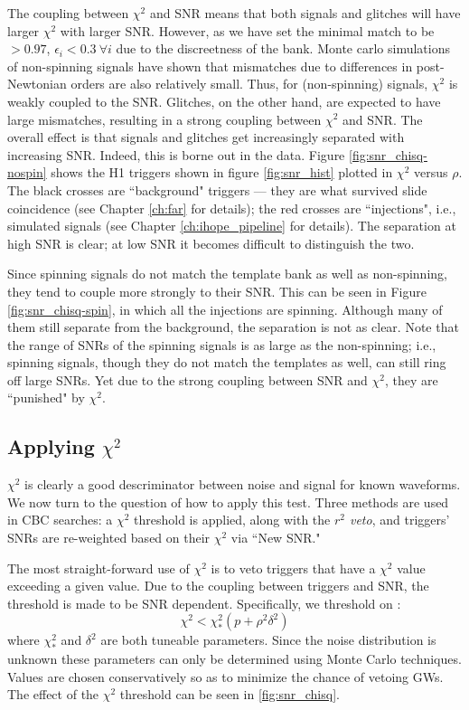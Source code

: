 The coupling between $\chi^2$ and \ac{SNR} means that both signals and glitches will have larger $\chi^2$ with larger \ac{SNR}. However, as we have set the minimal match to be $> 0.97$, $\epsilon_i < 0.3~\forall i$ due to the discreetness of the bank. Monte carlo simulations of non-spinning signals have shown that mismatches due to differences in post-Newtonian orders are also relatively small. Thus, for (non-spinning) signals, $\chi^2$ is weakly coupled to the \ac{SNR}. Glitches, on the other hand, are expected to have large mismatches, resulting in a strong coupling between $\chi^2$ and \ac{SNR}. The overall effect is that signals and glitches get increasingly separated with increasing \ac{SNR}. Indeed, this is borne out in the data. Figure \ref{fig:snr_chisq-nospin} shows the H1 triggers shown in figure \ref{fig:snr_hist} plotted in $\chi^2$ versus $\rho$. The black crosses are ``background" triggers --- they are what survived slide coincidence (see Chapter \ref{ch:far} for details); the red crosses are ``injections", i.e., simulated signals (see Chapter \ref{ch:ihope_pipeline} for details). The separation at high \ac{SNR} is clear; at low \ac{SNR} it becomes difficult to distinguish the two.

Since spinning signals do not match the template bank as well as non-spinning, they tend to couple more strongly to their \ac{SNR}. This can be seen in Figure \ref{fig:snr_chisq-spin}, in which all the injections are spinning. Although many of them still separate from the background, the separation is not as clear. Note that the range of \acp{SNR} of the spinning signals is as large as the non-spinning; i.e., spinning signals, though they do not match the templates as well, can still ring off large \acp{SNR}. Yet due to the strong coupling between \ac{SNR} and $\chi^2$, they are ``punished" by $\chi^2$. 

\subsection{Applying $\chi^2$}

$\chi^2$ is clearly a good descriminator between noise and signal for known waveforms. We now turn to the question of how to apply this test. Three methods are used in \ac{CBC} searches: a $\chi^2$ threshold is applied, along with the \emph{$r^2$ veto}, and triggers' \acp{SNR} are re-weighted based on their $\chi^2$ via ``New SNR."

The most straight-forward use of $\chi^2$ is to veto triggers that have a $\chi^2$ value exceeding a given value. Due to the coupling between triggers and \ac{SNR}, the threshold is made to be \ac{SNR} dependent. Specifically, we threshold on \cite{ref:Brown}:
\begin{equation}
\chi^2 <  \chi_{*}^2\left(p + \rho^2\delta^2\right)
\end{equation}
where $\chi_{*}^2$ and $\delta^2$ are both tuneable parameters. Since the noise distribution is unknown these parameters can only be determined using Monte Carlo techniques. Values are chosen conservatively so as to minimize the chance of vetoing \acp{GW}. The effect of the $\chi^2$ threshold can be seen in \ref{fig:snr_chisq}.

